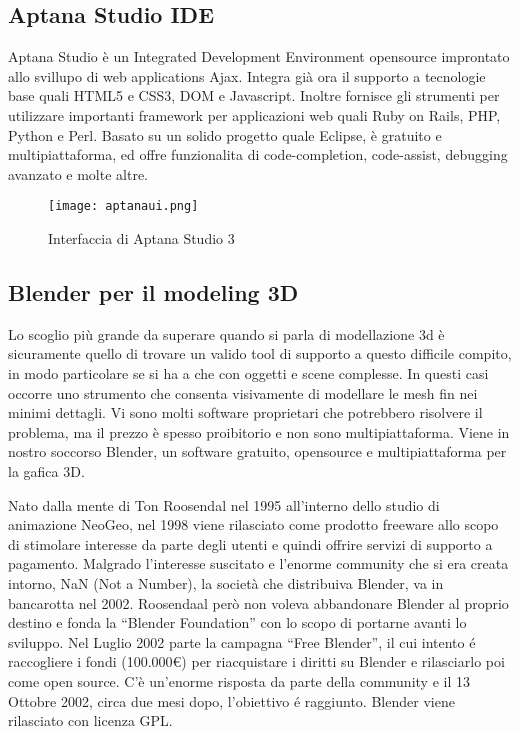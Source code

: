 \subsection{Aptana Studio IDE}
Aptana Studio è un Integrated Development Environment opensource improntato allo svillupo di web applications Ajax. Integra già ora il supporto a tecnologie base quali HTML5 e CSS3, DOM e Javascript. Inoltre fornisce gli strumenti per utilizzare importanti framework per applicazioni web quali Ruby on Rails, PHP, Python e Perl. Basato su un solido progetto quale Eclipse, è gratuito e multipiattaforma, ed offre funzionalita di code-completion, code-assist, debugging avanzato e molte altre. 

\begin{figure}[Ht]
\centering
\texttt{[image: aptanaui.png]}
\caption{Interfaccia di Aptana Studio 3}
\label{label:aptanaui}
\end{figure}

\subsection{Blender per il modeling 3D}
Lo scoglio più grande da superare quando si parla di modellazione 3d è sicuramente quello di trovare un valido tool di supporto a questo difficile compito, in modo particolare se si ha a che con oggetti e scene complesse. In questi casi occorre uno strumento che consenta visivamente di modellare le mesh fin nei minimi dettagli. Vi sono molti software proprietari che potrebbero risolvere il problema, ma il prezzo è spesso proibitorio e non sono multipiattaforma. Viene in nostro soccorso Blender, un software gratuito, opensource  e multipiattaforma per la gafica 3D. 

Nato dalla mente di Ton Roosendal nel 1995 all'interno dello studio di animazione NeoGeo, nel 1998 viene rilasciato come prodotto freeware allo scopo di stimolare interesse da parte degli utenti e quindi offrire servizi di supporto a pagamento. Malgrado l'interesse suscitato e l'enorme community che si era creata intorno, NaN (Not a Number), la società che distribuiva Blender, va in bancarotta nel 2002. Roosendaal però non voleva abbandonare Blender al proprio destino e fonda la “Blender Foundation” con lo scopo di  portarne avanti lo sviluppo. Nel Luglio 2002 parte la campagna “Free Blender”, il cui intento é raccogliere i fondi (100.000\euro) per riacquistare i diritti su Blender e rilasciarlo poi come open source. C'è un'enorme risposta da parte della community e il 13 Ottobre 2002, circa due mesi dopo, l'obiettivo é raggiunto. Blender viene rilasciato con licenza GPL.


